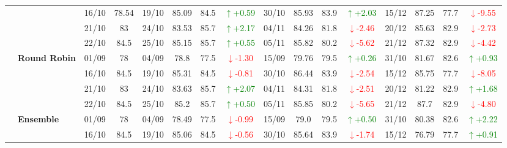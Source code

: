 {\begin{longtable}{llcc|cccc|cccc|cccc}
&
& 16/10 & 78.54 & 19/10 & 85.09 & 84.5 & \textcolor{green}{\(\uparrow\)+0.59} & 30/10 & 85.93 & 83.9 & \textcolor{green}{\(\uparrow\)+2.03} & 15/12 & 87.25 & 77.7 & \textcolor{red}{\(\downarrow\)-9.55} \\

&
& 21/10 & 83 & 24/10 & 83.53 & 85.7 & \textcolor{green}{\(\uparrow\)+2.17} & 04/11 & 84.26 & 81.8 & \textcolor{red}{\(\downarrow\)-2.46} & 20/12 & 85.63 & 82.9 & \textcolor{red}{\(\downarrow\)-2.73} \\

&
& 22/10 & 84.5 & 25/10 & 85.15 & 85.7 & \textcolor{green}{\(\uparrow\)+0.55} & 05/11 & 85.82 & 80.2 & \textcolor{red}{\(\downarrow\)-5.62} & 21/12 & 87.32 & 82.9 & \textcolor{red}{\(\downarrow\)-4.42} \\
\cmidrule(lr){2-16}


& \textbf{Round Robin}
& 01/09 & 78 & 04/09 & 78.8 & 77.5 & \textcolor{red}{\(\downarrow\)-1.30} & 15/09 & 79.76 & 79.5 & \textcolor{green}{\(\uparrow\)+0.26} & 31/10 & 81.67 & 82.6 & \textcolor{green}{\(\uparrow\)+0.93} \\

&
& 16/10 & 84.5 & 19/10 & 85.31 & 84.5 & \textcolor{red}{\(\downarrow\)-0.81} & 30/10 & 86.44 & 83.9 & \textcolor{red}{\(\downarrow\)-2.54} & 15/12 & 85.75 & 77.7 & \textcolor{red}{\(\downarrow\)-8.05} \\

&
& 21/10 & 83 & 24/10 & 83.63 & 85.7 & \textcolor{green}{\(\uparrow\)+2.07} & 04/11 & 84.31 & 81.8 & \textcolor{red}{\(\downarrow\)-2.51} & 20/12 & 81.22 & 82.9 & \textcolor{green}{\(\uparrow\)+1.68} \\

&
& 22/10 & 84.5 & 25/10 & 85.2 & 85.7 & \textcolor{green}{\(\uparrow\)+0.50} & 05/11 & 85.85 & 80.2 & \textcolor{red}{\(\downarrow\)-5.65} & 21/12 & 87.7 & 82.9 & \textcolor{red}{\(\downarrow\)-4.80} \\
\cmidrule(lr){2-16}




& \textbf{Ensemble}
& 01/09 & 78 & 04/09 & 78.49 & 77.5 & \textcolor{red}{\(\downarrow\)-0.99} & 15/09 & 79.0 & 79.5 & \textcolor{green}{\(\uparrow\)+0.50} & 31/10 & 80.38 & 82.6 & \textcolor{green}{\(\uparrow\)+2.22} \\

&
& 16/10 & 84.5 & 19/10 & 85.06 & 84.5 & \textcolor{red}{\(\downarrow\)-0.56} & 30/10 & 85.64 & 83.9 & \textcolor{red}{\(\downarrow\)-1.74} & 15/12 & 76.79 & 77.7 & \textcolor{green}{\(\uparrow\)+0.91} \\


\end{longtable}}
